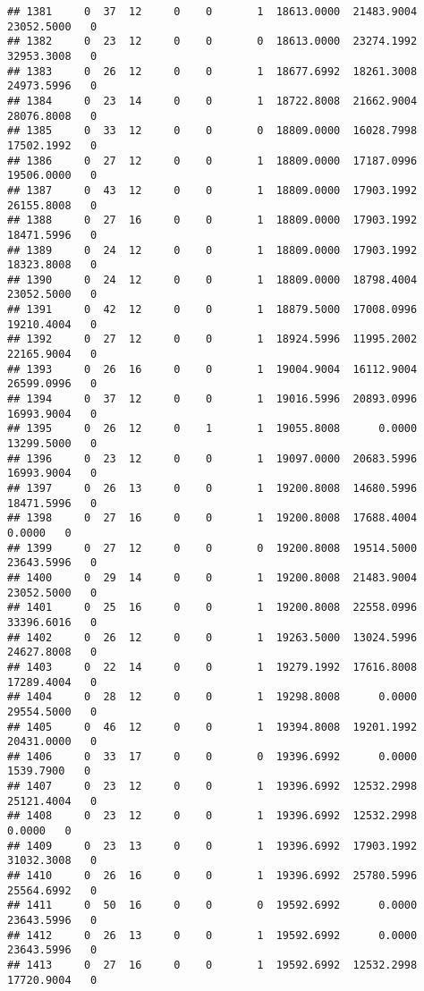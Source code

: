\documentclass[
]{article}
\begin{document}
\begin{enumerate}
\begin{verbatim}
## 1381     0  37  12     0    0       1  18613.0000  21483.9004  23052.5000   0
## 1382     0  23  12     0    0       0  18613.0000  23274.1992  32953.3008   0
## 1383     0  26  12     0    0       1  18677.6992  18261.3008  24973.5996   0
## 1384     0  23  14     0    0       1  18722.8008  21662.9004  28076.8008   0
## 1385     0  33  12     0    0       0  18809.0000  16028.7998  17502.1992   0
## 1386     0  27  12     0    0       1  18809.0000  17187.0996  19506.0000   0
## 1387     0  43  12     0    0       1  18809.0000  17903.1992  26155.8008   0
## 1388     0  27  16     0    0       1  18809.0000  17903.1992  18471.5996   0
## 1389     0  24  12     0    0       1  18809.0000  17903.1992  18323.8008   0
## 1390     0  24  12     0    0       1  18809.0000  18798.4004  23052.5000   0
## 1391     0  42  12     0    0       1  18879.5000  17008.0996  19210.4004   0
## 1392     0  27  12     0    0       1  18924.5996  11995.2002  22165.9004   0
## 1393     0  26  16     0    0       1  19004.9004  16112.9004  26599.0996   0
## 1394     0  37  12     0    0       1  19016.5996  20893.0996  16993.9004   0
## 1395     0  26  12     0    1       1  19055.8008      0.0000  13299.5000   0
## 1396     0  23  12     0    0       1  19097.0000  20683.5996  16993.9004   0
## 1397     0  26  13     0    0       1  19200.8008  14680.5996  18471.5996   0
## 1398     0  27  16     0    0       1  19200.8008  17688.4004      0.0000   0
## 1399     0  27  12     0    0       0  19200.8008  19514.5000  23643.5996   0
## 1400     0  29  14     0    0       1  19200.8008  21483.9004  23052.5000   0
## 1401     0  25  16     0    0       1  19200.8008  22558.0996  33396.6016   0
## 1402     0  26  12     0    0       1  19263.5000  13024.5996  24627.8008   0
## 1403     0  22  14     0    0       1  19279.1992  17616.8008  17289.4004   0
## 1404     0  28  12     0    0       1  19298.8008      0.0000  29554.5000   0
## 1405     0  46  12     0    0       1  19394.8008  19201.1992  20431.0000   0
## 1406     0  33  17     0    0       0  19396.6992      0.0000   1539.7900   0
## 1407     0  23  12     0    0       1  19396.6992  12532.2998  25121.4004   0
## 1408     0  23  12     0    0       1  19396.6992  12532.2998      0.0000   0
## 1409     0  23  13     0    0       1  19396.6992  17903.1992  31032.3008   0
## 1410     0  26  16     0    0       1  19396.6992  25780.5996  25564.6992   0
## 1411     0  50  16     0    0       0  19592.6992      0.0000  23643.5996   0
## 1412     0  26  13     0    0       1  19592.6992      0.0000  23643.5996   0
## 1413     0  27  16     0    0       1  19592.6992  12532.2998  17720.9004   0

\end{verbatim}
\end{enumerate}
\end{document}
